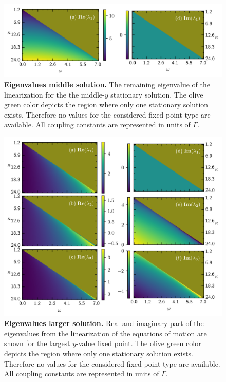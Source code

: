     \begin{figure}[H]
        \centering
        \includegraphics{pictures/lam_anal_m2.png}
        \caption{\textbf{Eigenvalues middle solution.} The remaining eigenvalue of the linearization for the the middle-$y$ stationary solution. The olive green color depicts the region where only one stationary solution exists. Therefore no values for the considered fixed point type are available. All coupling constants are represented in units of $\Gamma$.
        }
    \end{figure}
    \begin{figure}[H]
        \centering
        \includegraphics{pictures/lam_anal_l.png}
        \caption{\textbf{Eigenvalues larger solution.} Real and imaginary part of the eigenvalues from the linearization of the equations of motion are shown for the largest $y$-value fixed point. The olive green color depicts the region where only one stationary solution exists. Therefore no values for the considered fixed point type are available. All coupling constants are represented in units of $\Gamma$.
        }
    \end{figure}
    
